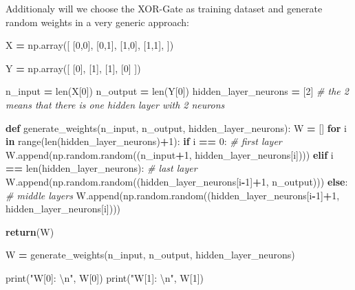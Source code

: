 \documentclass[
]{book}
\newenvironment{Shaded}{\begin{snugshade}}{\end{snugshade}}
\newcommand{\BuiltInTok}[1]{#1}
\newcommand{\CharTok}[1]{\textcolor[rgb]{0.31,0.60,0.02}{#1}}
\newcommand{\CommentTok}[1]{\textcolor[rgb]{0.56,0.35,0.01}{\textit{#1}}}
\newcommand{\ControlFlowTok}[1]{\textcolor[rgb]{0.13,0.29,0.53}{\textbf{#1}}}
\newcommand{\DecValTok}[1]{\textcolor[rgb]{0.00,0.00,0.81}{#1}}
\newcommand{\KeywordTok}[1]{\textcolor[rgb]{0.13,0.29,0.53}{\textbf{#1}}}
\newcommand{\NormalTok}[1]{#1}
\newcommand{\OperatorTok}[1]{\textcolor[rgb]{0.81,0.36,0.00}{\textbf{#1}}}
\newcommand{\StringTok}[1]{\textcolor[rgb]{0.31,0.60,0.02}{#1}}
\begin{document}
Additionaly will we choose the XOR-Gate as training dataset and generate random weights in a very generic approach:

\begin{Shaded}
\begin{Highlighting}[]
\NormalTok{X }\OperatorTok{=}\NormalTok{ np.array([}
\NormalTok{  [}\DecValTok{0}\NormalTok{,}\DecValTok{0}\NormalTok{],}
\NormalTok{  [}\DecValTok{0}\NormalTok{,}\DecValTok{1}\NormalTok{],}
\NormalTok{  [}\DecValTok{1}\NormalTok{,}\DecValTok{0}\NormalTok{],}
\NormalTok{  [}\DecValTok{1}\NormalTok{,}\DecValTok{1}\NormalTok{],}
\NormalTok{]) }

\NormalTok{Y }\OperatorTok{=}\NormalTok{ np.array([}
\NormalTok{  [}\DecValTok{0}\NormalTok{],}
\NormalTok{  [}\DecValTok{1}\NormalTok{],}
\NormalTok{  [}\DecValTok{1}\NormalTok{],}
\NormalTok{  [}\DecValTok{0}\NormalTok{]}
\NormalTok{])}

\NormalTok{n\_input }\OperatorTok{=} \BuiltInTok{len}\NormalTok{(X[}\DecValTok{0}\NormalTok{])}
\NormalTok{n\_output }\OperatorTok{=} \BuiltInTok{len}\NormalTok{(Y[}\DecValTok{0}\NormalTok{])}
\NormalTok{hidden\_layer\_neurons }\OperatorTok{=}\NormalTok{ [}\DecValTok{2}\NormalTok{] }\CommentTok{\# the 2 means that there is one hidden layer with 2 neurons}

\KeywordTok{def}\NormalTok{ generate\_weights(n\_input, n\_output, hidden\_layer\_neurons):}
\NormalTok{  W }\OperatorTok{=}\NormalTok{ []}
  \ControlFlowTok{for}\NormalTok{ i }\KeywordTok{in} \BuiltInTok{range}\NormalTok{(}\BuiltInTok{len}\NormalTok{(hidden\_layer\_neurons)}\OperatorTok{+}\DecValTok{1}\NormalTok{):}
    \ControlFlowTok{if}\NormalTok{ i }\OperatorTok{==} \DecValTok{0}\NormalTok{: }\CommentTok{\# first layer}
\NormalTok{      W.append(np.random.random((n\_input}\OperatorTok{+}\DecValTok{1}\NormalTok{, hidden\_layer\_neurons[i])))}
    \ControlFlowTok{elif}\NormalTok{ i }\OperatorTok{==} \BuiltInTok{len}\NormalTok{(hidden\_layer\_neurons): }\CommentTok{\# last layer}
\NormalTok{      W.append(np.random.random((hidden\_layer\_neurons[i}\OperatorTok{{-}}\DecValTok{1}\NormalTok{]}\OperatorTok{+}\DecValTok{1}\NormalTok{, n\_output)))}
    \ControlFlowTok{else}\NormalTok{: }\CommentTok{\# middle layers}
\NormalTok{      W.append(np.random.random((hidden\_layer\_neurons[i}\OperatorTok{{-}}\DecValTok{1}\NormalTok{]}\OperatorTok{+}\DecValTok{1}\NormalTok{, hidden\_layer\_neurons[i])))}
   
  \ControlFlowTok{return}\NormalTok{(W)}

\NormalTok{W }\OperatorTok{=}\NormalTok{ generate\_weights(n\_input, n\_output, hidden\_layer\_neurons)}

\BuiltInTok{print}\NormalTok{(}\StringTok{"W[0]: }\CharTok{\textbackslash{}n}\StringTok{"}\NormalTok{, W[}\DecValTok{0}\NormalTok{])}
\BuiltInTok{print}\NormalTok{(}\StringTok{"W[1]: }\CharTok{\textbackslash{}n}\StringTok{"}\NormalTok{, W[}\DecValTok{1}\NormalTok{])}
\end{Highlighting}
\end{Shaded}
\end{document}
